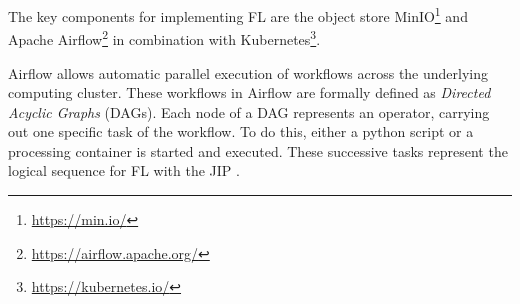 The key components for implementing FL are the object store MinIO\footnote{\url{https://min.io/}} and Apache Airflow\footnote{\url{https://airflow.apache.org/}} in combination with Kubernetes\footnote{\url{https://kubernetes.io/}}.

Airflow allows automatic parallel execution of workflows across the underlying computing cluster. These workflows in Airflow are formally defined as \textit{Directed Acyclic Graphs} (DAGs). Each node of a DAG represents an operator, carrying out one specific task of the workflow. To do this, either a python script or a processing container is started and executed.
These successive tasks represent the logical sequence for FL with the JIP \citep{Scherer2020JointAnalytics}.
